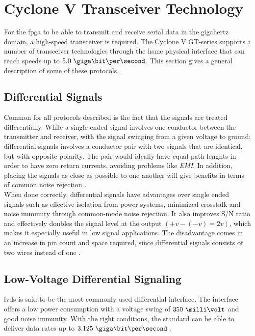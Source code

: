 \documentclass[main.tex]{subfiles}
\begin{document}
\chapter{Cyclone V Transceiver Technology}

For the \gls{fpga} to be able to transmit and receive serial data in the gigahertz domain, a high-speed transceiver is required. The Cyclone V GT-series supports a number of transceiver technologies through the \gls{hsmc} physical interface that can reach speeds up to $5.0\ \giga\bit\per\second$. This section gives a general description of some of these protocols.

\section{Differential Signals} \label{subsec:diffsig}

Common for all protocols described is the fact that the signals are treated differentially. While a single ended signal involves one conductor between the transmitter and receiver, with the signal swinging from a given voltage to ground; differential signals involves a conductor pair with two signals that are identical, but with opposite polarity. The pair would ideally have equal path lenghts in order to have zero return currents, avoiding problems like \textit{EMI}. In addition, placing the signals as close as possible to one another will give benefits in terms of common noise rejection \cite{douglas01}.\\

When done correctly, differential signals have advantages over single ended signals such as effective isolation from power systems, minimized crosstalk and noise immunity through common-mode noise rejection. It also improves S/N ratio and effectively doubles the signal level at the output $(+v - (-v) = 2v)$, which makes it especially useful in low signal applications. The disadvantage comes in an increase in pin count and space required, since differential signals consists of two wires instead of one \cite{douglas01}.

\section{Low-Voltage Differential Signaling} \label{sec:lvds}

\gls{lvds} is said to be the most commonly used differential interface. The interface offers a low power consumption with a voltage swing of $350\ \milli\volt$ and good noise immunity. With the right conditions, the standard can be able to deliver data rates up to $3.125\ \giga\bit\per\second$ \cite{ti08lvds}.\\
\end{document}
